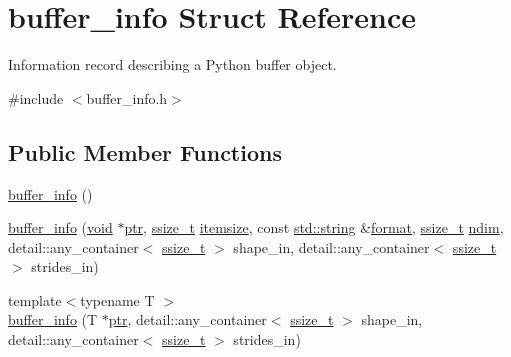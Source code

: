 \hypertarget{structbuffer__info}{}\section{buffer\+\_\+info Struct Reference}
\label{structbuffer__info}


Information record describing a Python buffer object.  




{\ttfamily \#include $<$buffer\+\_\+info.\+h$>$}

\subsection*{Public Member Functions}
\begin{DoxyCompactItemize}
\item 
\mbox{\hyperlink{structbuffer__info_a7ba465a026eab59b502922baceb7e196}{buffer\+\_\+info}} ()
\item 
\mbox{\hyperlink{structbuffer__info_a453e5b1373b00938414661fa169506b0}{buffer\+\_\+info}} (\mbox{\hyperlink{_s_d_l__opengles2__gl2ext_8h_ae5d8fa23ad07c48bb609509eae494c95}{void}} $\ast$\mbox{\hyperlink{structbuffer__info_a2976ad4b157156ebbcffe667888e2d28}{ptr}}, \mbox{\hyperlink{detail_2common_8h_ac430d16fc097b3bf0a7469cfd09decda}{ssize\+\_\+t}} \mbox{\hyperlink{structbuffer__info_a8a95447f854c217a3b76168627900139}{itemsize}}, const \mbox{\hyperlink{_s_d_l__opengl__glext_8h_ab4ccfaa8ab0e1afaae94dc96ef52dde1}{std\+::string}} \&\mbox{\hyperlink{_s_d_l__audio_8h_a71a65ffd977afe9c3fef116a5bc9ee27}{format}}, \mbox{\hyperlink{detail_2common_8h_ac430d16fc097b3bf0a7469cfd09decda}{ssize\+\_\+t}} \mbox{\hyperlink{structbuffer__info_a81d14cf3fc7ceae1b811f335bf35cd97}{ndim}}, detail\+::any\+\_\+container$<$ \mbox{\hyperlink{detail_2common_8h_ac430d16fc097b3bf0a7469cfd09decda}{ssize\+\_\+t}} $>$ shape\+\_\+in, detail\+::any\+\_\+container$<$ \mbox{\hyperlink{detail_2common_8h_ac430d16fc097b3bf0a7469cfd09decda}{ssize\+\_\+t}} $>$ strides\+\_\+in)
\item 
{\footnotesize template$<$typename T $>$ }\\\mbox{\hyperlink{structbuffer__info_a7b8f6155115e1c4a73e1dd4d8944fcdb}{buffer\+\_\+info}} (T $\ast$\mbox{\hyperlink{structbuffer__info_a2976ad4b157156ebbcffe667888e2d28}{ptr}}, detail\+::any\+\_\+container$<$ \mbox{\hyperlink{detail_2common_8h_ac430d16fc097b3bf0a7469cfd09decda}{ssize\+\_\+t}} $>$ shape\+\_\+in, detail\+::any\+\_\+container$<$ \mbox{\hyperlink{detail_2common_8h_ac430d16fc097b3bf0a7469cfd09decda}{ssize\+\_\+t}} $>$ strides\+\_\+in)

\end{DoxyCompactItemize}
